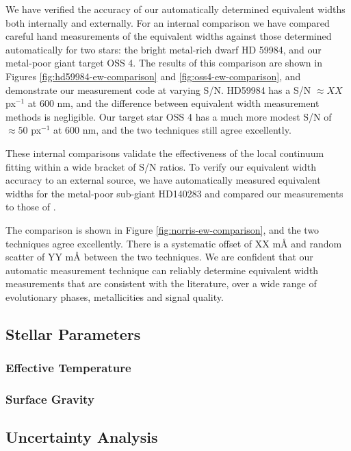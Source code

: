 \documentclass{emulateapj}
\begin{document}
We have verified the accuracy of our automatically determined equivalent widths both internally and externally. For an internal comparison we have compared careful hand measurements of the equivalent widths against those determined automatically for two stars: the bright metal-rich dwarf HD 59984, and our metal-poor giant target OSS 4. The results of this comparison are shown in Figures \ref{fig:hd59984-ew-comparison} and \ref{fig:oss4-ew-comparison}, and demonstrate our measurement code at varying S/N. HD59984 has a S/N $\approx XX$ px$^{-1}$ at 600 nm, and the difference between equivalent width measurement methods is negligible. Our target star OSS 4 has a much more modest S/N of $\approx50$ px$^{-1}$ at 600 nm, and the two techniques still agree excellently.

These internal comparisons validate the effectiveness of the local continuum fitting within a wide bracket of S/N ratios. To verify our equivalent width accuracy to an external source, we have automatically measured equivalent widths for the metal-poor sub-giant HD140283 and compared our measurements to those of \citet{Norris;et-al_1996}. 

The comparison is shown in Figure \ref{fig:norris-ew-comparison}, and the two techniques agree excellently. There is a systematic offset of XX m\AA{} and random scatter of YY m\AA{} between the two techniques. We are confident that our automatic measurement technique can reliably determine equivalent width measurements that are consistent with the literature, over a wide range of evolutionary phases, metallicities and signal quality.



\subsection{Stellar Parameters}


\subsubsection{Effective Temperature}

\subsubsection{Surface Gravity}

\subsection{Uncertainty Analysis}
\end{document}
